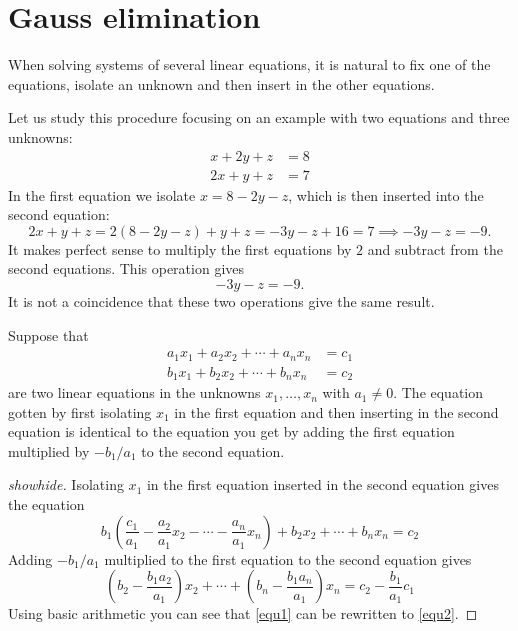 \documentclass{article}
\begin{document}
\section{Gauss elimination}

When solving systems of several linear equations, it is natural to
fix one of the equations, isolate an unknown and then insert
in the other equations.

Let us study this procedure focusing on an example with
two equations and three unknowns:
\begin{align*}
x + 2 y + z &= 8\\
2 x + y + z &= 7
\end{align*}
In the first equation we isolate $x = 8 - 2 y - z$, which is then inserted into the second
equation:
$$
2 x + y + z = 2(8 - 2 y - z) + y + z = - 3 y - z + 16 = 7 \implies -3 y - z = -9. 
$$
It makes perfect sense to multiply the first equations by $2$ and subtract from the second
equations. This operation gives
$$
-3 y -  z = -9.
$$
It is not a coincidence that these two operations give the same result.


\begin{theorem}
Suppose that  
\begin{align*}
a_1 x_1 + a_2 x_2 + \cdots + a_n x_n &= c_1\\
b_1 x_1 + b_2 x_2 + \cdots + b_n x_n &= c_2
\end{align*}
are two linear equations in the unknowns $x_1, \dots, x_n$ with
$a_1\neq 0$. The equation gotten by first isolating
$x_1$ in the first equation and then inserting in the second equation
is identical to the equation you get by adding the first equation multiplied 
by $-b_1/a_1$ to the second equation.
\end{theorem}
\begin{proof}[showhide]
  Isolating $x_1$ in the first equation inserted in the second equation gives
  the equation
\begin{equation}\label{equ1}
b_1\left(\frac{c_1}{a_1} - \frac{a_2}{a_1} x_2 - \cdots -\frac{a_n}{a_1} x_n\right) + b_2 x_2 + \cdots + b_n x_n = c_2
\end{equation}
Adding $-b_1/a_1$ multiplied to the first equation to the second equation gives
\begin{equation}\label{equ2}
\left(b_2 - \frac{b_1 a_2}{a_1}\right) x_2 + \cdots +
\left(b_n - \frac{b_1 a_n}{a_1}\right) x_n = c_2 - \frac{b_1}{a_1} c_1
\end{equation}
Using basic arithmetic you can see that \eqref{equ1} can be rewritten to
\eqref{equ2}. 
\end{proof}
\end{document}
